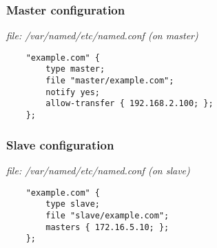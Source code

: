 \documentclass[10pt]{beamer}
\begin{document}
\begin{frame}[fragile]
	\frametitle{Master configuration}
	
	\emph{file: /var/named/etc/named.conf (on master)}
	\begin{verbatim}
	"example.com" {
	    type master;
	    file "master/example.com";
	    notify yes;
	    allow-transfer { 192.168.2.100; };
	};
	\end{verbatim}
\end{frame}

\begin{frame}[fragile]
	\frametitle{Slave configuration}
	
	\emph{file: /var/named/etc/named.conf (on slave)}
	\begin{verbatim}
	"example.com" {
	    type slave;
	    file "slave/example.com";
	    masters { 172.16.5.10; };
	};
	\end{verbatim}
\end{frame}
\end{document}
